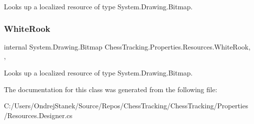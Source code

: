 Looks up a localized resource of type System.\+Drawing.\+Bitmap. 

\mbox{\label{class_chess_tracking_1_1_properties_1_1_resources_a83b1d5e7dc68f14ae9316ed90e634820}} 
\subsubsection{\texorpdfstring{WhiteRook}{WhiteRook}}
{\footnotesize\ttfamily internal System.\+Drawing.\+Bitmap Chess\+Tracking.\+Properties.\+Resources.\+White\+Rook\hspace{0.3cm}{\ttfamily [static]}, {\ttfamily [get]}, {\ttfamily [private]}}



Looks up a localized resource of type System.\+Drawing.\+Bitmap. 



The documentation for this class was generated from the following file\+:\begin{DoxyCompactItemize}
\item 
C\+:/\+Users/\+Ondrej\+Stanek/\+Source/\+Repos/\+Chess\+Tracking/\+Chess\+Tracking/\+Properties/Resources.\+Designer.\+cs\end{DoxyCompactItemize}
